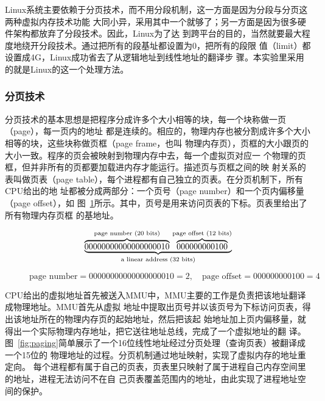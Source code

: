 \documentclass{swfcthesismscctex}
\begin{document}
Linux系统主要依赖于分页技术，而不用分段机制，这一方面是因为分段与分页这两种虚拟内存技术功能
大同小异，采用其中一个就够了；另一方面是因为很多硬件架构都放弃了分段技术。因此，Linux为了达
到跨平台的目的，当然就要最大程度地绕开分段技术。通过把所有的段基址都设置为0，把所有的段限
值（limit）都设置成4G，Linux成功省去了从逻辑地址到线性地址的翻译步
骤\cite{gorman2004understanding}。本实验里采用的就是Linux的这一个处理方法。

\subsubsection{分页技术}

分页技术的基本思想是把程序分成许多个大小相等的块，每一个块称做一页（page），每一页内的地址
都是连续的。相应的，物理内存也被分割成许多个大小相等的块，这些块称做页框（page frame，也叫
物理内存页），页框的大小跟页的大小一致。程序的页会被映射到物理内存中去，每一个虚拟页对应一
个物理的页框，但并非所有的页都要加载进内存才能运行\cite{Sibasankar2010}。描述页与页框之间的映
射关系的表叫做页表（page table），每个进程都有自己独立的页表。在分页机制下，所有CPU给出的地
址都被分成两部分：一个页号（page number）和一个页内偏移量（page offset），如
图~\ref{fig:linear-addr}所示。其中，页号是用来访问页表的下标。页表里给出了所有物理内存页框
的基地址。

\begin{figure}[!ht]
  \centering
  \begin{Large}
    \[%
      \underbrace{%
        \overbrace{00000000000000000010}^{\text{page number (20 bits)}}\,%
        \overbrace{000000000100}^{\text{page offset (12 bits)}}}_{\text{a linear address
          (32 bits)}}%
    \]
  \end{Large}
    \begin{small}
      \[\text{page number}=00000000000000000010=2, \quad \text{page offset}=000000000100=4\]
    \end{small}  
  \label{fig:linear-addr}
\end{figure}

CPU给出的虚拟地址首先被送入MMU中，MMU主要的工作是负责把该地址翻译成物理地址。MMU首先从虚拟
地址中提取出页号并以该页号为下标访问页表，得出该地址所在的物理内存页的起始地址，然后把该起
始地址加上页内偏移量，就得出一个实际物理内存地址，把它送往地址总线，完成了一个虚拟地址的翻
译。图~\ref{fig:paging}简单展示了一个16位线性地址经过分页处理（查询页表）被翻译成一个15位的
物理地址的过程\cite{tanenbaum2008modern}。分页机制通过地址映射，实现了虚拟内存的地址重定向。
每个进程都有属于自己的页表，页表里只映射了属于进程自己内存空间里的地址，进程无法访问不在自
己页表覆盖范围内的地址，由此实现了进程地址空间的保护。
\end{document}
